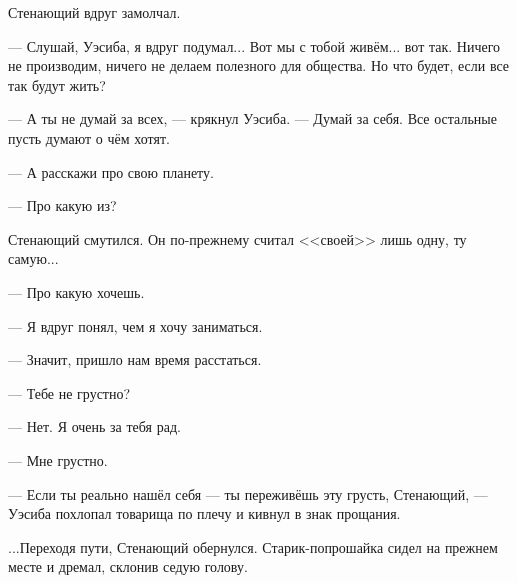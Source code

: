 \documentclass[a4paper,12pt,fleqn]{book}\usepackage{cooltooltips}\usepackage{polyglossia}\setdefaultlanguage[babelshorthands=true]{russian}\setotherlanguage{english}\defaultfontfeatures{Ligatures=TeX,Mapping=tex-text} \usepackage{xcolor}\definecolor{lightgray}{HTML}{bbbbbb}\color{lightgray}\newcommand{\ml}[3]{\textenglish{\textcolor{black}{#3}}}
\newcommand{\asterism}{\vspace{1em}{\centering\Large\bfseries$\ast~\ast~\ast$\par}\vspace{1em}}
\begin{document}
Стенающий вдруг замолчал.

--- Слушай, Уэсиба, я вдруг подумал...
Вот мы с тобой живём... вот так.
Ничего не производим, ничего не делаем полезного для общества.
Но что будет, если все так будут жить?

--- А ты не думай за всех, --- крякнул Уэсиба.
--- Думай за себя.
Все остальные пусть думают о чём хотят.

--- А расскажи про свою планету.

--- Про какую из?

Стенающий смутился.
Он по-прежнему считал <<своей>> лишь одну, ту самую...

--- Про какую хочешь.

\asterism

--- Я вдруг понял, чем я хочу заниматься.

--- Значит, пришло нам время расстаться.

--- Тебе не грустно?

--- Нет.
Я очень за тебя рад.

--- Мне грустно.

--- Если ты реально нашёл себя --- ты переживёшь эту грусть, Стенающий, --- Уэсиба похлопал товарища по плечу и кивнул в знак прощания.

...Переходя пути, Стенающий обернулся.
Старик-попрошайка сидел на прежнем месте и дремал, склонив седую голову.
\end{document}
